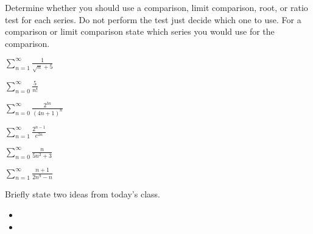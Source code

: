 \begin{problem}
\item Determine whether you should use a comparison, limit comparison,
  root, or ratio test for each series. Do not perform the test just decide
  which one to use. For a comparison or limit comparison state which
  series you would use for the comparison.
  \begin{subproblem}
    \item $\sum_{n=1}^\infty \frac{1}{\sqrt{n}+5}$
      \vfill
    \item $\sum_{n=0}^\infty \frac{5}{n!}$
      \vfill
    \item $\sum_{n=0}^\infty \frac{2^{3n}}{(4n+1)^n} $
      \vfill
      \clearpage
    \item $\sum_{n=1}^\infty \frac{2^{n-1}}{e^{2n}}$
      \vfill
    \item $\sum_{n=0}^\infty \frac{n}{5n^2+3} $
      \vfill
    \item $\sum_{n=1}^\infty \frac{n+1}{2n^9-n}$
      \vfill
  \end{subproblem}
\end{problem}


\postClass

\begin{problem}
\item Briefly state two ideas from today's class.
  \begin{itemize}
  \item
  \item
  \end{itemize}
\item
  \begin{subproblem}
    \item
  \end{subproblem}
\end{problem}



